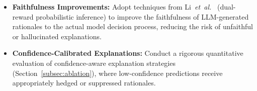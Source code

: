 \begin{itemize}[leftmargin=*]
    \item \textbf{Faithfulness Improvements:} Adopt techniques from Li~\emph{et~al.}~\cite{li2025drift} (dual-reward probabilistic inference) to improve the faithfulness of LLM-generated rationales to the actual model decision process, reducing the risk of unfaithful or hallucinated explanations.

    \item \textbf{Confidence-Calibrated Explanations:} Conduct a rigorous quantitative evaluation of confidence-aware explanation strategies (Section~\ref{subsec:ablation}), where low-confidence predictions receive appropriately hedged or suppressed rationales.
\end{itemize}
